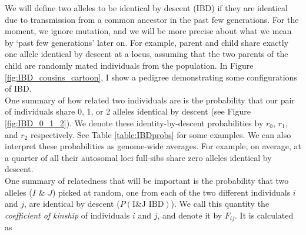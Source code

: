 {{We will define two alleles to be identical by descent (IBD) if they are
identical due to transmission from a common ancestor in the past few generations\cite{cotterman:40,malecot:48}. For the moment,
we ignore mutation, and we will be more precise about what we mean by `past few
generations' later on. For example, parent and child share exactly one allele
identical by descent at a locus, assuming that the two parents of the child are
randomly mated individuals from the population. In Figure
\ref{fig:IBD_cousins_cartoon}, I show a pedigree demonstrating some
configurations of IBD. \\

One summary of how related two individuals are is the probability that our pair
of individuals share 0, 1, or 2 alleles identical by descent (see Figure
\ref{fig:IBD_0_1_2}). We denote these  identity-by-descent probabilities by $r_0$, $r_1$, and $r_2$
respectively. See Table \ref{table:IBDprobs} for some examples. We can also
interpret these probabilities as genome-wide averages. For example, on average, at a quarter of all their autosomal loci
full-sibs share zero alleles identical by descent.\\



One summary of relatedness that will be important is the probability that two
alleles ($I$ \& $J$) picked at random, one from each of the two different individuals $i$
and $j$, are identical by descent ($P(\text{I\&J IBD})$). We call this quantity the \emph{coefficient
of kinship} of individuals $i$ and $j$, and denote it by $F_{ij}$. It is
calculated as

}}
